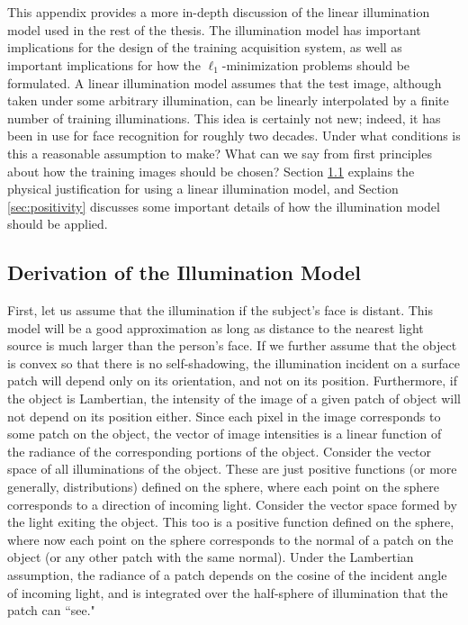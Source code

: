 \chapter{}
\label{chap:appendix_illumination}

This appendix provides a more in-depth discussion of the linear illumination
model used in the rest of the thesis.  The illumination model has important
implications for the design of the training acquisition system, as well
as important implications for how the $\ell_1$-minimization problems should
be formulated.
A linear illumination model assumes that the test image, although taken under some
arbitrary illumination, can be linearly interpolated by a finite number of
training illuminations.  This idea is certainly not new; indeed, it has been in
use for face recognition for roughly two decades\cite{Turk1991-CVPR}.  Under
what conditions is this a reasonable assumption to make?  What can we say from
first principles about how the training images should be chosen?  
Section \ref{sec:illumination_derivation} explains the physical justification
for using a linear illumination model, and Section \ref{sec:positivity}
discusses some important details of how the illumination model should be 
applied.

\section{Derivation of the Illumination Model}
\label{sec:illumination_derivation}
%
First, let us assume that the illumination if the subject's face is distant.
This model will be a good approximation as long as distance to the nearest
light source is much larger than the person's face.  If we further assume that
the object is convex so that there is no self-shadowing, the illumination
incident on a surface patch will depend only on its orientation, and not on its
position.  Furthermore, if the object is Lambertian, the intensity of the image
of a given patch of object will not depend on its position either.  Since each
pixel in the image corresponds to some patch on the object, the vector of image
intensities is a linear function of the radiance of the corresponding portions
of the object.  Consider the vector space of all illuminations of the object.
These are just positive functions (or more generally, distributions) defined on
the sphere, where each point on the sphere corresponds to a direction of
incoming light.  Consider the vector space formed by the light exiting the
object.  This too is a positive function defined on the sphere, where now each
point on the sphere corresponds to the normal of a patch on the object (or any
other patch with the same normal).  Under the Lambertian assumption, the
radiance of a patch depends on the cosine of the incident angle of incoming
light, and is integrated over the half-sphere of illumination that the patch
can ``see."

